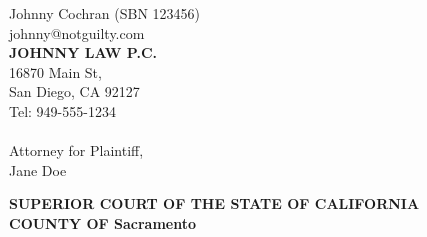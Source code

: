 \documentclass[letter]{camotionblue}
\renewcommand{\singlespacing}{\setstretch{1}\setlength{\baselineskip}{13pt plus 0pt minus 0pt}}
\renewcommand{\doublespacing}{\setstretch{2}\setlength{\baselineskip}{26pt plus 0pt minus 0pt}}
\renewcommand\firstpartytitle{Plaintiff\xspace}
\newcommand\firstpartyname{Jane Doe\xspace}
\newcommand\captioncounty{Sacramento\xspace}
\begin{document}
	\begin{singlespace*}
		\singlespacing
		\label{caption}
		Johnny Cochran (SBN 123456)\\
		johnny@notguilty.com\\
		\textbf{JOHNNY LAW P.C.}\\
		16870 Main St,\\
		San Diego, CA 92127\\
		Tel: 949-555-1234\\
		\\
		Attorney for \firstpartytitle,\\
		\MakeUppercase\firstpartyname\\
		
		
		\phantom{end}		
	\end{singlespace*}
	
	\doublespacing
	
	\startcourtname
	
	
	\begin{tightcenter}
		\textbf{SUPERIOR COURT OF THE STATE OF CALIFORNIA \\ 
			COUNTY OF \MakeUppercase\captioncounty }
	\end{tightcenter}
	
	\vspace{4pt}
	
\end{document}

